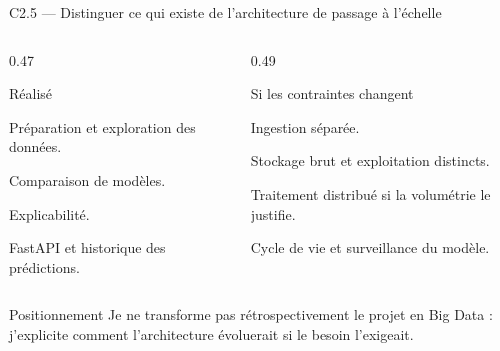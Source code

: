 \begin{frame}{C2.5 — Distinguer ce qui existe de l'architecture de passage à l'échelle}
\begin{columns}[T]
\begin{column}{0.47\linewidth}
\begin{block}{Réalisé}
\begin{tightitems}
  \item Préparation et exploration des données.
  \item Comparaison de modèles.
  \item Explicabilité.
  \item FastAPI et historique des prédictions.
\end{tightitems}
\end{block}
\end{column}
\begin{column}{0.49\linewidth}
\begin{block}{Si les contraintes changent}
\begin{tightitems}
  \item Ingestion séparée.
  \item Stockage brut et exploitation distincts.
  \item Traitement distribué si la volumétrie le justifie.
  \item Cycle de vie et surveillance du modèle.
\end{tightitems}
\end{block}
\end{column}
\end{columns}
\begin{block}{Positionnement}
Je ne transforme pas rétrospectivement le projet en Big Data : j'explicite comment l'architecture évoluerait si le besoin l'exigeait.
\end{block}
\end{frame}

